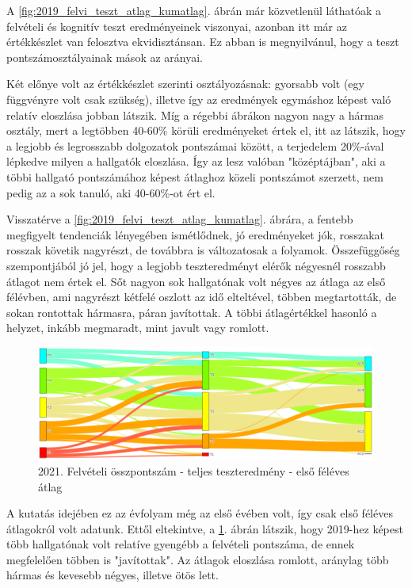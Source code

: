 \documentclass[12pt]{article}
\begin{document}
A \ref{fig:2019_felvi_teszt_atlag_kumatlag}. ábrán már közvetlenül láthatóak a felvételi és kognitív teszt eredményeinek viszonyai, azonban itt már az értékkészlet van felosztva ekvidisztánsan. Ez abban is megnyilvánul, hogy a teszt pontszámosztályainak mások az arányai. 

Két előnye volt az értékkészlet szerinti osztályozásnak: gyorsabb volt (egy függvényre volt csak szükség), illetve így az eredmények egymáshoz képest való relatív eloszlása jobban látszik. Míg a régebbi ábrákon nagyon nagy a hármas osztály, mert a legtöbben 40-60\% körüli eredményeket értek el, itt az látszik, hogy a legjobb és legrosszabb dolgozatok pontszámai között, a terjedelem 20\%-ával lépkedve milyen a hallgatók eloszlása. Így az lesz valóban "középtájban", aki a többi hallgató pontszámához képest átlaghoz közeli pontszámot szerzett, nem pedig az a sok tanuló, aki 40-60\%-ot ért el.

Visszatérve a \ref{fig:2019_felvi_teszt_atlag_kumatlag}. ábrára, a fentebb megfigyelt tendenciák lényegében ismétlődnek, jó eredményeket jók, rosszakat rosszak követik nagyrészt, de továbbra is változatosak a folyamok. Összefüggőség szempontjából jó jel, hogy a legjobb teszteredményt elérők négyesnél rosszabb átlagot nem értek el. Sőt nagyon sok hallgatónak volt négyes az átlaga az első félévben, ami nagyrészt kétfelé oszlott az idő elteltével, többen megtartották, de sokan rontottak hármasra, páran javítottak. A többi átlagértékkel hasonló a helyzet, inkább megmaradt, mint javult vagy romlott.


\begin{figure}[H]
\centering
\includegraphics[scale=0.6]{kepek/2021_felvi_teszt_atlag.png}
\caption{2021. Felvételi összpontszám - teljes teszteredmény - első féléves átlag}
\label{fig:2021_felvi_teszt_atlag}
\end{figure}

A kutatás idejében ez az évfolyam még az első évében volt, így csak első féléves átlagokról volt adatunk. Ettől eltekintve, a \ref{fig:2021_felvi_teszt_atlag}. ábrán látszik, hogy 2019-hez képest több hallgatónak volt relatíve gyengébb a felvételi pontszáma, de ennek megfelelően többen is "javítottak". Az átlagok eloszlása romlott, aránylag több hármas és kevesebb négyes, illetve ötös lett. 
\end{document}
